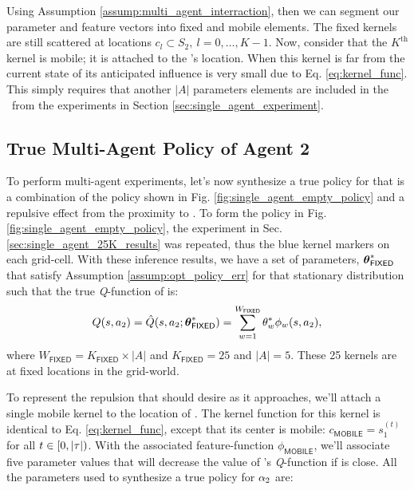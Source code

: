 Using Assumption \ref{assump:multi_agent_interraction}, then we can segment our parameter and feature vectors into
fixed and mobile elements. The fixed kernels are still scattered at locations $c_l \subset S_2,\ l=0,\ldots,K-1$.
Now, consider that the $K^{\text{th}}$ kernel is mobile; it is attached to the \!'s location. When this kernel is far from the
current state of  its anticipated influence is very small due to Eq. \ref{eq:kernel_func}. This simply
requires that another $|A|$ parameters elements are included in the \paramVec\ from the experiments in Section \ref{sec:single_agent_experiment}.


\subsection{True Multi-Agent Policy of Agent 2} \label{sec:true_agent_2_multi_agent_policy}

    \begin{figure}[htb]
	\begin{center}
	\end{center}
\end{figure}

To perform multi-agent experiments, let's now synthesize a true policy for  that is a combination of the policy shown in Fig. \ref{fig:single_agent_empty_policy} and a repulsive effect from the proximity to . To form the policy in Fig. \ref{fig:single_agent_empty_policy}, the experiment in Sec. \ref{sec:single_agent_25K_results} was repeated, thus the blue kernel markers on each grid-cell. With these inference results, we have a set of parameters, $\boldsymbol{\mathbb{\theta}}^*_{\mathsf{FIXED}}$ that satisfy Assumption \ref{assump:opt_policy_err} for that stationary distribution such that the true \emph{Q}-function of  is:
\[
Q(s,a_2) = \hat{Q}(s,a_2; \boldsymbol{\mathbb{\theta}}^*_{\mathsf{FIXED}}) = \sum_{w=1}^{W_{\mathsf{FIXED}}} \theta^*_{w} \phi_{w}(s,a_2),
\]
where $W_{\mathsf{FIXED}}=K_{\mathsf{FIXED}}\times |A|$ and $K_{\mathsf{FIXED}}=25$ and $|A|=5$. These 25 kernels are at fixed locations in the grid-world.

To represent the repulsion that  should desire as it  approaches, we'll attach a single mobile kernel to the location of . The kernel function for this kernel is identical to Eq. \ref{eq:kernel_func}, except that its center is mobile: $c_{\mathsf{MOBILE}} = s_1^{(t)}$ for all $t \in [0,|\tau|)$. With the associated feature-function $\phi_{\mathsf{MOBILE}}$, we'll associate five parameter values that will decrease the value of 's \emph{Q}-function if  is close. All the parameters used to synthesize a true policy for $\alpha_{2}$ are:


